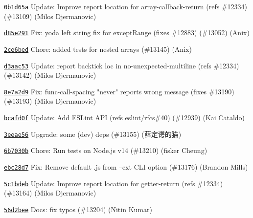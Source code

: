\begin{DoxyItemize}
\item \href{https://github.com/eslint/eslint/commit/0b1d65a45aa5dfe08cd596c420490e81b546317e}{\texttt{ {\ttfamily 0b1d65a}}} Update\+: Improve report location for array-\/callback-\/return (refs \#12334) (\#13109) (Milos Djermanovic)
\item \href{https://github.com/eslint/eslint/commit/d85e291d1b56960373031f2562547df7285444f7}{\texttt{ {\ttfamily d85e291}}} Fix\+: yoda left string fix for except\+Range (fixes \#12883) (\#13052) (Anix)
\item \href{https://github.com/eslint/eslint/commit/2ce6bed04cad376003f70447ece4b6578c142bfd}{\texttt{ {\ttfamily 2ce6bed}}} Chore\+: added tests for nested arrays (\#13145) (Anix)
\item \href{https://github.com/eslint/eslint/commit/d3aac532f6a24c633f85dedf0e552eabd22d0956}{\texttt{ {\ttfamily d3aac53}}} Update\+: report backtick loc in no-\/unexpected-\/multiline (refs \#12334) (\#13142) (Milos Djermanovic)
\item \href{https://github.com/eslint/eslint/commit/8e7a2d93595cfe0c1597af0e7873853369251c0b}{\texttt{ {\ttfamily 8e7a2d9}}} Fix\+: func-\/call-\/spacing "{}never"{} reports wrong message (fixes \#13190) (\#13193) (Milos Djermanovic)
\item \href{https://github.com/eslint/eslint/commit/bcafd0f8508e19ab8087a35fac7b97fc4295df3e}{\texttt{ {\ttfamily bcafd0f}}} Update\+: Add ESLint API (refs eslint/rfcs\#40) (\#12939) (Kai Cataldo)
\item \href{https://github.com/eslint/eslint/commit/3eeae565bfb0834a31e5d3a253a17bbf4027cf88}{\texttt{ {\ttfamily 3eeae56}}} Upgrade\+: some (dev) deps (\#13155) (薛定谔的猫)
\item \href{https://github.com/eslint/eslint/commit/6b7030b1a1e1e3d1a3953cfa9722074d6a6fc1a9}{\texttt{ {\ttfamily 6b7030b}}} Chore\+: Run tests on Node.\+js v14 (\#13210) (fisker Cheung)
\item \href{https://github.com/eslint/eslint/commit/ebc28d76658f1f3e4e8d56e70a25752b5d4a6686}{\texttt{ {\ttfamily ebc28d7}}} Fix\+: Remove default .js from --ext CLI option (\#13176) (Brandon Mills)
\item \href{https://github.com/eslint/eslint/commit/5c1bdebcf728062fd41583886830c89b65485df9}{\texttt{ {\ttfamily 5c1bdeb}}} Update\+: Improve report location for getter-\/return (refs \#12334) (\#13164) (Milos Djermanovic)
\item \href{https://github.com/eslint/eslint/commit/56d2beea0ea0b6395a6d4a3e116ea6a964ff92f3}{\texttt{ {\ttfamily 56d2bee}}} Docs\+: fix typos (\#13204) (Nitin Kumar)

\end{DoxyItemize}
